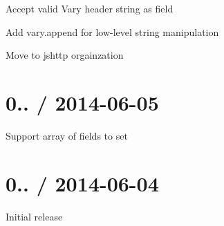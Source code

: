 
\begin{DoxyItemize}
\item Accept valid {\ttfamily Vary} header string as {\ttfamily field}
\item Add {\ttfamily vary.\+append} for low-\/level string manipulation
\item Move to {\ttfamily jshttp} orgainzation
\end{DoxyItemize}

\section*{0.. / 2014-\/06-\/05 }


\begin{DoxyItemize}
\item Support array of fields to set
\end{DoxyItemize}

\section*{0.. / 2014-\/06-\/04 }


\begin{DoxyItemize}
\item Initial release 
\end{DoxyItemize}